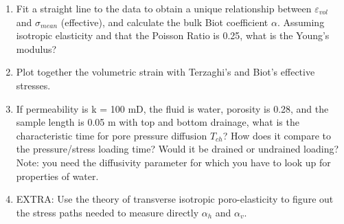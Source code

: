 \documentclass[8pt]{extarticle}
\begin{document}
\begin{enumerate}
\def\labelenumi{\alph{enumi}.}
\setcounter{enumi}{2}
\item
  Fit a straight line to the data to obtain a unique relationship
  between \(\varepsilon_{vol}\) and \(\sigma_{mean}\) (effective), and
  calculate the bulk Biot coefficient \(\alpha\). Assuming isotropic
  elasticity and that the Poisson Ratio is 0.25, what is the Young's
  modulus?
\item
  Plot together the volumetric strain with Terzaghi's and Biot's
  effective stresses.
\item
  If permeability is k = 100 mD, the fluid is water, porosity is 0.28,
  and the sample length is 0.05 m with top and bottom drainage, what is
  the characteristic time for pore pressure diffusion \(T_{ch}\)? How
  does it compare to the pressure/stress loading time? Would it be
  drained or undrained loading? Note: you need the diffusivity parameter
  for which you have to look up for properties of water.
\item
  EXTRA: Use the theory of transverse isotropic poro-elasticity to
  figure out the stress paths needed to measure directly \(\alpha_h\)
  and \(\alpha_v\).
\end{enumerate}
\end{document}
